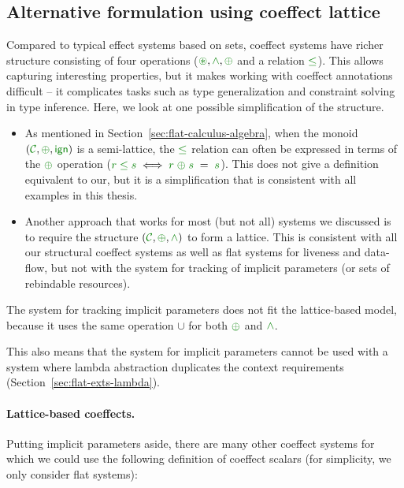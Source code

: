 
\subsection{Alternative formulation using coeffect lattice}
\label{sec:unified-impl-semilattice}

Compared to typical effect systems based on sets, coeffect systems have richer structure consisting
of four operations ($\cseq,\czip,\cpar$ and a relation $\cleq$). This allows capturing interesting 
properties, but it makes working with coeffect annotations difficult -- it complicates tasks
such as type generalization and constraint solving in type inference. Here, we look at one possible 
simplification of the structure.

\begin{itemize}
\item As mentioned in Section~\ref{sec:flat-calculus-algebra}, when the monoid $(\C,\cpar,\czero)$ is a
semi-lattice, the $\cleq$ relation can often be expressed in terms of the $\cpar$ operation 
($\cclrd{r} \;\cleq\; \cclrd{s} \;\Longleftrightarrow\; \cclrd{r} \;\cpar\; \cclrd{s} \;=\; \cclrd{s}$).
This does not give a definition equivalent to our, but it is a simplification that is consistent 
with all examples in this thesis.

\item Another approach that works for most (but not all) systems we discussed is to require the structure
$(\C,\cpar,\czip)$ to form a lattice. This is consistent with all our structural coeffect systems as
well as flat systems for liveness and data-flow, but not with the system for tracking of implicit
parameters (or sets of rebindable resources).
\end{itemize}

\noindent
The system for tracking implicit parameters does not fit the lattice-based model, because it uses the 
same operation $\cup$ for both $\cpar$ and $\czip$. 

This also means that the system for implicit parameters cannot be used with a system where lambda 
abstraction duplicates the context requirements (Section~\ref{sec:flat-exts-lambda}). 

\paragraph{Lattice-based coeffects.} Putting implicit parameters aside, there are many other coeffect
systems for which we could use the following definition of coeffect scalars (for simplicity, we only 
consider flat systems):

